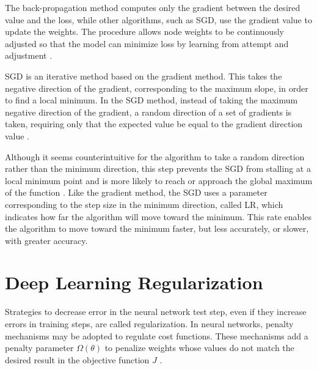 The back-propagation method computes only the gradient between the desired value and the loss, while other algorithms, such as \ac{SGD}, use the gradient value to update the weights.
The procedure allows node weights to be continuously adjusted so that the model can minimize loss by learning from attempt and adjustment \cite[Ch. 8]{Goodfellow2016} \cite{Rumelhart1988}.

\ac{SGD} is an iterative method based on the gradient method. 
This takes the negative direction of the gradient, corresponding to the maximum slope, in order to find a local minimum.
In the \ac{SGD} method, instead of taking the maximum negative direction of the gradient, a random direction of a set of gradients is taken, requiring only that the expected value be equal to the gradient direction value \cite[Ch. 8]{Goodfellow2016}. 

Although it seems counterintuitive for the algorithm to take a random direction rather than the minimum direction, this step prevents the \ac{SGD} from stalling at a local minimum point and is more likely to reach or approach the global maximum of the function \cite{Kiwiel2001ConvergenceAE}. 
Like the gradient method, the \ac{SGD} uses a parameter corresponding to the step size in the minimum direction, called \ac{LR}, which indicates how far the algorithm will move toward the minimum.
This rate enables the algorithm to move toward the minimum faster, but less accurately, or slower, with greater accuracy.

\section{Deep Learning Regularization}
\label{cap2_regulariz_deep_learning}

Strategies to decrease error in the neural network test step, even if they increase errors in training steps, are called regularization.
In neural networks, penalty mechanisms may be adopted to regulate cost functions.
These mechanisms add a penalty parameter $\Omega(\theta)$ to penalize weights whose values do not match the desired result in the objective function $J$ \cite[Ch. 7]{Goodfellow2016}.

